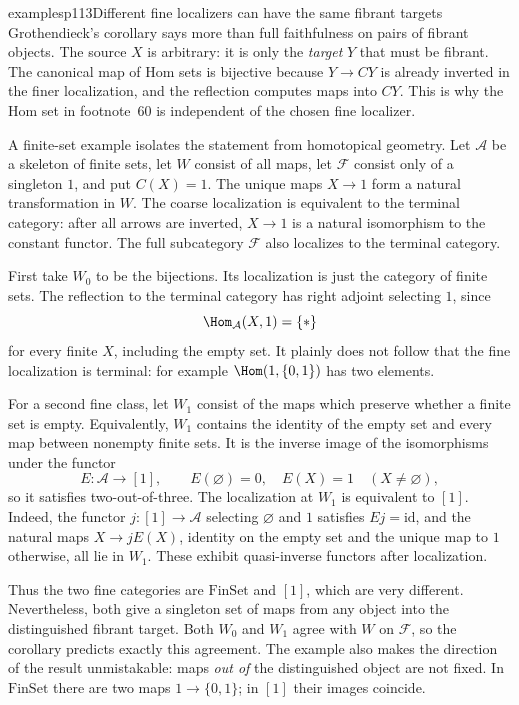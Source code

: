 \begin{dcomment}{examples}{p113}{Different fine localizers can have the same fibrant targets}
Grothendieck's corollary says more than full faithfulness on pairs of fibrant objects. The source $X$ is arbitrary: it is only the \emph{target} $Y$ that must be fibrant. The canonical map of Hom sets is bijective because $Y\to CY$ is already inverted in the finer localization, and the reflection computes maps into $CY$. This is why the Hom set in footnote~60 is independent of the chosen fine localizer.

A finite-set example isolates the statement from homotopical geometry. Let $\mathcal A$ be a skeleton of finite sets, let $W$ consist of all maps, let $\mathcal F$ consist only of a singleton $1$, and put $C(X)=1$. The unique maps $X\to1$ form a natural transformation in $W$. The coarse localization is equivalent to the terminal category: after all arrows are inverted, $X\to1$ is a natural isomorphism to the constant functor. The full subcategory $\mathcal F$ also localizes to the terminal category.

First take $W_0$ to be the bijections. Its localization is just the category of finite sets. The reflection to the terminal category has right adjoint selecting $1$, since
\[
 \Hom_{\mathcal A}(X,1)=\{*\}
\]
for every finite $X$, including the empty set. It plainly does not follow that the fine localization is terminal: for example $\Hom(1,\{0,1\})$ has two elements.

For a second fine class, let $W_1$ consist of the maps which preserve whether a finite set is empty. Equivalently, $W_1$ contains the identity of the empty set and every map between nonempty finite sets. It is the inverse image of the isomorphisms under the functor
\[
 E:\mathcal A\to[1],\qquad
 E(\varnothing)=0,\quad E(X)=1\quad(X\ne\varnothing),
\]
so it satisfies two-out-of-three. The localization at $W_1$ is equivalent to $[1]$. Indeed, the functor $j:[1]\to\mathcal A$ selecting $\varnothing$ and $1$ satisfies $Ej=\mathrm{id}$, and the natural maps $X\to jE(X)$, identity on the empty set and the unique map to $1$ otherwise, all lie in $W_1$. These exhibit quasi-inverse functors after localization.

Thus the two fine categories are $\mathrm{FinSet}$ and $[1]$, which are very different. Nevertheless, both give a singleton set of maps from any object into the distinguished fibrant target. Both $W_0$ and $W_1$ agree with $W$ on $\mathcal F$, so the corollary predicts exactly this agreement. The example also makes the direction of the result unmistakable: maps \emph{out of} the distinguished object are not fixed. In $\mathrm{FinSet}$ there are two maps $1\to\{0,1\}$; in $[1]$ their images coincide.
\end{dcomment}

